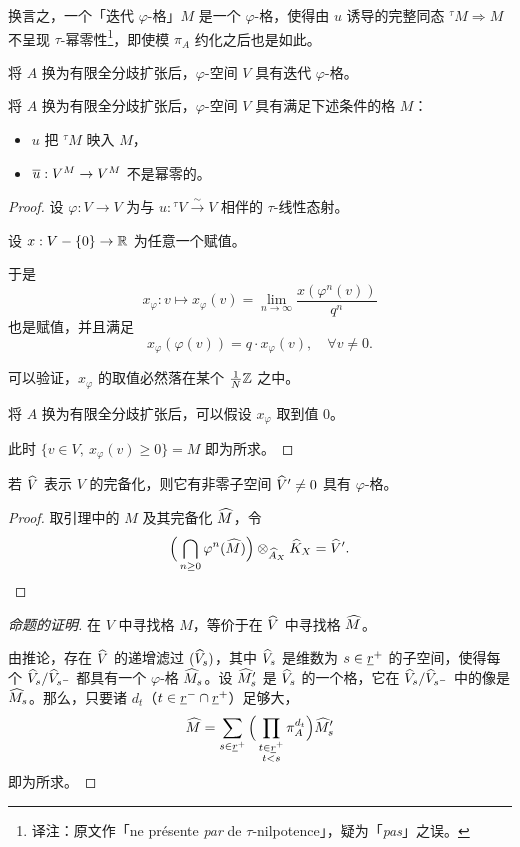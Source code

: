 换言之，一个「迭代 $\varphi$-格」$M$ 是一个 $\varphi$-格，使得由 $u$ 诱导的完整同态 $^\tau M\Rightarrow M$ 不呈现 $\tau$-幂零性\footnote{译注：原文作「ne présente \emph{par} de $\tau$-nilpotence」，疑为「\emph{pas}」之误。}，即使模 $\pi_A$ 约化之后也是如此。

\begin{proposition*}
将 $A$ 换为有限全分歧扩张后，$\varphi$-空间 $V$ 具有迭代 $\varphi$-格。
\end{proposition*}

\begin{lemma*}[Drinfeld]
将 $A$ 换为有限全分歧扩张后，$\varphi$-空间 $V$ 具有满足下述条件的格 $M$：
\begin{itemize}
\item $u$ 把 $^\tau M$ 映入 $M$，
\item $\overline u:V^M\to V^M$ 不是幂零的。
\end{itemize}
\end{lemma*}

\begin{proof}
设 $\varphi:V\to V$ 为与 $u:{}^\tau V\overset{\sim}{\longrightarrow}V$ 相伴的 $\tau$-线性态射。

设 $x:V-\{0\}\to\mathbb{R}$ 为任意一个赋值。

于是
\[ x_\varphi : v\mapsto x_\varphi(v)=\lim_{n\to\infty}\frac{x(\varphi^n(v))}{q^n} \]
也是赋值，并且满足
\[ x_\varphi(\varphi(v))=q\cdot x_\varphi(v),\quad\forall v\neq 0. \]

可以验证，$x_\varphi$ 的取值必然落在某个 $\frac{1}{N}\mathbb{Z}$ 之中。

将 $A$ 换为有限全分歧扩张后，可以假设 $x_\varphi$ 取到值 0。

此时 $\{v\in V,\ x_\varphi(v)\ge 0\}=M$ 即为所求。
\end{proof}

\begin{corollary*}
若 $\widehat V$ 表示 $V$ 的完备化，则它有非零子空间 $\widehat V'\neq 0$ 具有 $\varphi$-格。
\end{corollary*}

\begin{proof}
取引理中的 $M$ 及其完备化 $\widehat M$，令
\[ \Big( \bigcap_{n\ge 0}\varphi^n(\widehat M) \Big)\otimes_{\widehat A_X}\widehat K_X=\widehat V'. \]
\end{proof}

\begin{proof}[命题的证明]
在 $V$ 中寻找格 $M$，等价于在 $\widehat V$ 中寻找格 $\widehat M$。

由推论，存在 $\widehat V$ 的递增滤过 $(\widehat V_s)$，其中 $\widehat V_s$ 是维数为 $s\in\ul r^{+}$ 的子空间，使得每个 $\widehat V_s/\widehat V_{s^-}$ 都具有一个 $\varphi$-格 $\widehat M_s$。设 $\widehat M'_s$ 是 $\widehat V_s$ 的一个格，它在 $\widehat V_s/\widehat V_{s^-}$ 中的像是 $\widehat M_s$。那么，只要诸 $d_t$（$t\in\ul r^{-}\cap\ul r^{+}$）足够大，
\[ \wh M=\sum_{s\in\ul r^{+}}\Big( \prod_{\substack{t\in\ul r^{+}\\ t<s}}\pi_A^{d_t} \Big)\wh M'_s \]
即为所求。
\end{proof}

